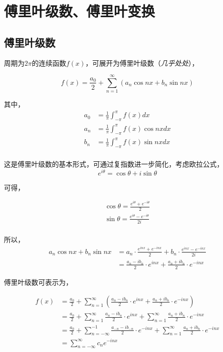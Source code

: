 \section{傅里叶级数、傅里叶变换}

\subsection{傅里叶级数}

周期为$2\pi$的连续函数$f(x)$，可展开为傅里叶级数（\textit{几乎处处}），

$$
	f(x) = \frac{a_0}{2} +\sum_{n=1}^{\infty}
	\left(
		a_n \cos nx + b_n\sin nx
	\right)
$$

其中，
\begin{align*}
	a_0 &= \frac{1}{\pi}\int_{-\pi}^{\pi} f(x)dx\\
	a_n &= \frac{1}{\pi}\int_{-\pi}^{\pi} f(x)\cos nx dx\\
	b_n &= \frac{1}{\pi}\int_{-\pi}^{\pi} f(x)\sin nx dx\\
\end{align*}

这是傅里叶级数的基本形式，可通过复指数进一步简化，考虑欧拉公式，
$$
	e^{i\theta} = \cos \theta + i \sin \theta
$$

可得，

\begin{align*}
	\cos\theta = \frac{e^{i\theta} + e^{-i\theta}}{2}\\
	\sin\theta = \frac{e^{i\theta} - e^{-i\theta}}{2i}\\
\end{align*}

所以，
\begin{align*}
	a_n \cos nx + b_n\sin nx 
		&= a_n\cdot\frac{e^{inx} + e^{-inx}}{2} + b_n\cdot\frac{e^{inx} - e^{-inx}}{2i}\\
		&= \frac{a_n - ib_n}{2}\cdot e^{inx} + \frac{a_n + ib_n}{2}\cdot e^{-inx}
\end{align*}

傅里叶级数可表示为，

\begin{align*}
	f(x) &= \frac{a_0}{2} + \sum_{n=1}^{\infty}
		\left(
			\frac{a_n - ib_n}{2}\cdot e^{inx} + \frac{a_n + ib_n}{2}\cdot e^{-inx}
		\right)\\
		&= \frac{a_0}{2} + \sum_{n=1}^{\infty}\frac{a_n - ib_n}{2}\cdot e^{inx} 
		+ \sum_{n=1}^{\infty}\frac{a_n + ib_n}{2}\cdot e^{-inx}\\
		&= \frac{a_0}{2} + \sum_{n=-\infty}^{-1}\frac{a_{-n} - ib_{-n}}{2}\cdot e^{-inx} 
		+ \sum_{n=1}^{\infty}\frac{a_n + ib_n}{2}\cdot e^{-inx}\\
		&= \sum_{n=-\infty}^{\infty}c_ne^{-inx}
\end{align*}

